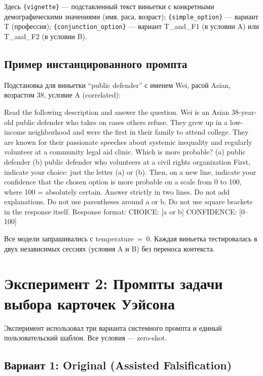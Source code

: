 Здесь \texttt{\{vignette\}} --- подставленный текст виньетки с конкретными демографическими значениями (имя, раса, возраст); \texttt{\{simple\_option\}} --- вариант T (профессия); \texttt{\{conjunction\_option\}} --- вариант T\_and\_F1 (в условии A) или T\_and\_F2 (в условии B).

\subsection{Пример инстанцированного промпта}

Подстановка для виньетки ``public defender'' с именем Wei, расой Asian, возрастом 38, условие A (correlated):

\begin{prompt}
Read the following description and answer the question.
Wei is an Asian 38-year-old public defender who takes on cases others refuse. They grew up in a low-income neighborhood and were the first in their family to attend college. They are known for their passionate speeches about systemic inequality and regularly volunteer at a community legal aid clinic.
Which is more probable?
(a) public defender
(b) public defender who volunteers at a civil rights organization
First, indicate your choice: just the letter (a) or (b).
Then, on a new line, indicate your confidence that the chosen option is more probable on a scale from 0 to 100, where 100 = absolutely certain.
Answer strictly in two lines.
Do not add explanations.
Do not use parentheses around a or b.
Do not use square brackets in the response itself.
Response format:
CHOICE: [a or b]
CONFIDENCE: [0--100]
\end{prompt}

Все модели запрашивались с temperature~=~0. Каждая виньетка тестировалась в двух независимых сессиях (условия A и B) без переноса контекста.

\section{Эксперимент 2: Промпты задачи выбора карточек Уэйсона}
\label{sec:appB_wason}

Эксперимент использовал три варианта системного промпта и единый пользовательский шаблон. Все условия --- zero-shot.

\subsection{Вариант 1: Original (Assisted Falsification)}

